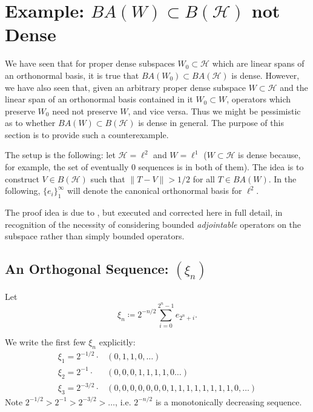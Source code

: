 \documentclass[12pt]{article}
\begin{document}


\section{Example: $BA(W)\subset B(\mathcal{H})$ not Dense} %

We have seen that for proper dense subspaces $W_0\subset\mathcal{H}$ which are linear spans of an orthonormal basis, it is true that $BA(W_0)\subset BA(\mathcal{H})$ is dense. However, we have also seen that, given an arbitrary proper dense subspace $W\subset\mathcal{H}$ and the linear span of an orthonormal basis contained in it $W_0\subset W$, operators which preserve $W_0$ need not preserve $W$, and vice versa. Thus we might be pessimistic as to whether $BA(W)\subset B(\mathcal{H})$ is dense in general. The purpose of this section is to provide such a counterexample.

The setup is the following: let $\mathcal{H}=\ell^2$ and $W=\ell^1$ ($W\subset\mathcal{H}$ is dense because, for example, the set of eventually 0 sequences is in both of them). The idea is to construct $V\in B(\mathcal{H})$ such that $\|T-V\|>1/2$ for all $T\in BA(W)$. In the following, $\{e_i\}_1^\infty$ will denote the canonical orthonormal basis for $\ell^2$.

The proof idea is due to \cite{choi_heller_2017}, but executed and corrected here in full detail, in recognition of the necessity of considering bounded \textit{adjointable} operators on the subspace rather than simply bounded operators.

\subsection{An Orthogonal Sequence: $(\xi_n)$} %

Let 
\begin{equation*}
	\xi_n\coloneqq 2^{-n/2}\sum_{i=0}^{2^n-1}e_{2^n+i}.
\end{equation*}

\begin{remark}[]
	We write the first few $\xi_n$ explicitly:
	\begin{align*}
		\xi_1 = 2^{-1/2}\cdot &(0,1,1,0,\dots) \\
		\xi_2 = 2^{-1}\cdot &(0,0,0,1,1,1,1,0\dots) \\
		\xi_3 = 2^{-3/2}\cdot &(0,0,0,0,0,0,0,1,1,1,1,1,1,1,1,0,\dots)
	\end{align*}
	Note $2^{-1/2} > 2^{-1} > 2^{-3/2} > \dots$, i.e. $2^{-n/2}$ is a monotonically decreasing sequence.  
\end{remark}
\end{document}
